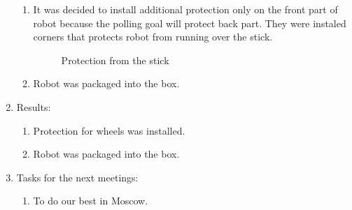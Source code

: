 \begin{enumerate}
\begin{enumerate}
		\item It was decided to install additional protection only on the front part of robot because the polling goal will protect back part. They were instaled corners that protects robot from running over the stick.
		\begin{figure}[H]
			\begin{minipage}[h]{0.4\linewidth}
			\end{minipage}
			\hfill
			\begin{minipage}[h]{0.55\linewidth}
			\end{minipage}
			\caption{Protection from the stick}
		\end{figure}
		
		\item Robot was packaged into the box.
		
	\end{enumerate}
	
	\item Results:
	\begin{enumerate}
		
		\item Protection for wheels was installed.
		
		\item Robot was packaged into the box.
		
	\end{enumerate}
	
	\item Tasks for the next meetings:
	\begin{enumerate}
		
		\item To do our best in Moscow.
			
	\end{enumerate}
\end{enumerate}
\fillpage
